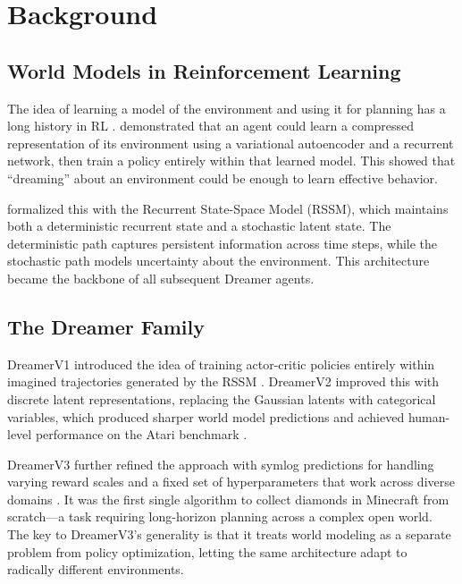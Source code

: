 \documentclass[letterpaper]{article}
\begin{document}
\section{Background}

\subsection{World Models in Reinforcement Learning}

The idea of learning a model of the environment and using it for planning has a long history in RL \citep{sutton2018rl}. \citet{ha2018world} demonstrated that an agent could learn a compressed representation of its environment using a variational autoencoder and a recurrent network, then train a policy entirely within that learned model. This showed that ``dreaming'' about an environment could be enough to learn effective behavior.

\citet{hafner2019planet} formalized this with the Recurrent State-Space Model (RSSM), which maintains both a deterministic recurrent state and a stochastic latent state. The deterministic path captures persistent information across time steps, while the stochastic path models uncertainty about the environment. This architecture became the backbone of all subsequent Dreamer agents.

\subsection{The Dreamer Family}

DreamerV1 introduced the idea of training actor-critic policies entirely within imagined trajectories generated by the RSSM \citep{hafner2020dreamerv1}. DreamerV2 improved this with discrete latent representations, replacing the Gaussian latents with categorical variables, which produced sharper world model predictions and achieved human-level performance on the Atari benchmark \citep{hafner2021dreamerv2}.

DreamerV3 further refined the approach with symlog predictions for handling varying reward scales and a fixed set of hyperparameters that work across diverse domains \citep{hafner2025dreamerv3}. It was the first single algorithm to collect diamonds in Minecraft from scratch---a task requiring long-horizon planning across a complex open world. The key to DreamerV3's generality is that it treats world modeling as a separate problem from policy optimization, letting the same architecture adapt to radically different environments.
\end{document}

